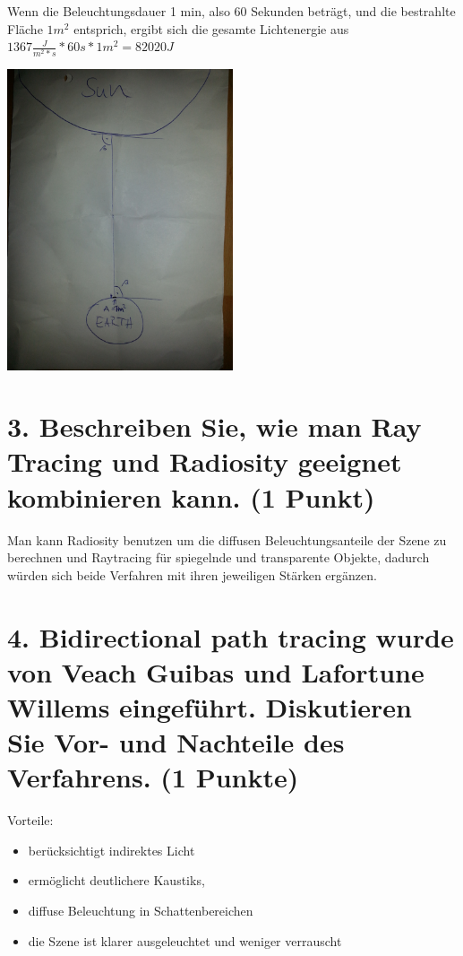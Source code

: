 \documentclass[12pt]{scrreprt}
\begin{document}
Wenn die Beleuchtungsdauer 1 min, also 60 Sekunden beträgt, und die bestrahlte Fläche $1 m^2$ entsprich, ergibt sich die gesamte Lichtenergie aus $1367 \frac{J}{m^2 * s} * 60 s * 1 m^2 = 82020 J$

\begin{center}
        \includegraphics[width=0.5\textwidth]{skizze}
\end{center}

\section*{3. Beschreiben Sie, wie man Ray Tracing und Radiosity geeignet kombinieren kann. (1 Punkt)}

Man kann Radiosity benutzen um die diffusen Beleuchtungsanteile der Szene zu berechnen und Raytracing für spiegelnde und transparente Objekte, dadurch würden sich beide Verfahren mit ihren jeweiligen Stärken ergänzen.


\section*{4. Bidirectional path tracing wurde von Veach Guibas und Lafortune Willems eingeführt. Diskutieren Sie Vor- und Nachteile des Verfahrens. (1 Punkte)}

Vorteile:

\begin{itemize}
  \item berücksichtigt indirektes Licht
  \item ermöglicht deutlichere Kaustiks,
  \item diffuse Beleuchtung in Schattenbereichen
  \item die Szene ist klarer ausgeleuchtet und weniger verrauscht
\end{itemize}
\end{document}
